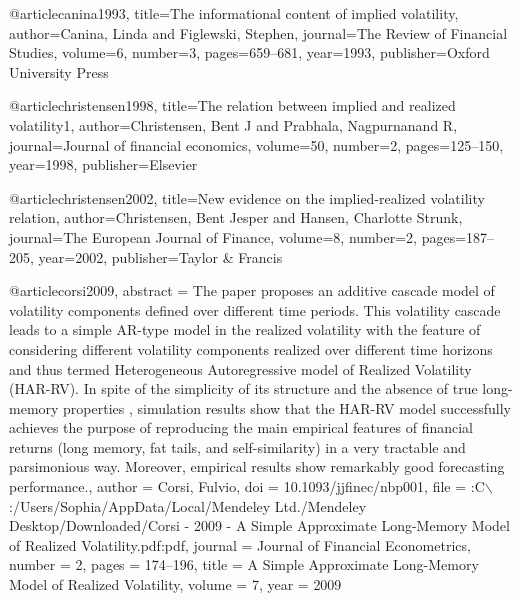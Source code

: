 @article{canina1993,
  title={The informational content of implied volatility},
  author={Canina, Linda and Figlewski, Stephen},
  journal={The Review of Financial Studies},
  volume={6},
  number={3},
  pages={659--681},
  year={1993},
  publisher={Oxford University Press}
}

@article{christensen1998,
  title={The relation between implied and realized volatility1},
  author={Christensen, Bent J and Prabhala, Nagpurnanand R},
  journal={Journal of financial economics},
  volume={50},
  number={2},
  pages={125--150},
  year={1998},
  publisher={Elsevier}
}

@article{christensen2002,
  title={New evidence on the implied-realized volatility relation},
  author={Christensen, Bent Jesper and Hansen, Charlotte Strunk},
  journal={The European Journal of Finance},
  volume={8},
  number={2},
  pages={187--205},
  year={2002},
  publisher={Taylor \& Francis}
}

@article{corsi2009,
abstract = {The paper proposes an additive cascade model of volatility components defined over different time periods. This volatility cascade leads to a simple AR-type model in the realized volatility with the feature of considering different volatility components realized over different time horizons and thus termed Heterogeneous Autoregressive model of Realized Volatility (HAR-RV). In spite of the simplicity of its structure and the absence of true long-memory properties , simulation results show that the HAR-RV model successfully achieves the purpose of reproducing the main empirical features of financial returns (long memory, fat tails, and self-similarity) in a very tractable and parsimonious way. Moreover, empirical results show remarkably good forecasting performance.},
author = {Corsi, Fulvio},
doi = {10.1093/jjfinec/nbp001},
file = {:C$\backslash$:/Users/Sophia/AppData/Local/Mendeley Ltd./Mendeley Desktop/Downloaded/Corsi - 2009 - A Simple Approximate Long-Memory Model of Realized Volatility.pdf:pdf},
journal = {Journal of Financial Econometrics},
number = {2},
pages = {174--196},
title = {{A Simple Approximate Long-Memory Model of Realized Volatility}},
volume = {7},
year = {2009}
}

